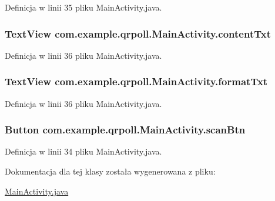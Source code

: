 Definicja w linii 35 pliku Main\+Activity.\+java.

\hypertarget{classcom_1_1example_1_1qrpoll_1_1_main_activity_aee6c7adea75224ec647353db3ca58124}{
\subsubsection[{content\+Txt}]{\setlength{\rightskip}{0pt plus 5cm}Text\+View com.\+example.\+qrpoll.\+Main\+Activity.\+content\+Txt\hspace{0.3cm}{\ttfamily [package]}}}\label{classcom_1_1example_1_1qrpoll_1_1_main_activity_aee6c7adea75224ec647353db3ca58124}


Definicja w linii 36 pliku Main\+Activity.\+java.

\hypertarget{classcom_1_1example_1_1qrpoll_1_1_main_activity_ac2f96df8bbad653bdd8630d749a23ddc}{
\subsubsection[{format\+Txt}]{\setlength{\rightskip}{0pt plus 5cm}Text\+View com.\+example.\+qrpoll.\+Main\+Activity.\+format\+Txt\hspace{0.3cm}{\ttfamily [private]}}}\label{classcom_1_1example_1_1qrpoll_1_1_main_activity_ac2f96df8bbad653bdd8630d749a23ddc}


Definicja w linii 36 pliku Main\+Activity.\+java.

\hypertarget{classcom_1_1example_1_1qrpoll_1_1_main_activity_a24aa61710d9b421c0d23ab545b4f8b99}{
\subsubsection[{scan\+Btn}]{\setlength{\rightskip}{0pt plus 5cm}Button com.\+example.\+qrpoll.\+Main\+Activity.\+scan\+Btn\hspace{0.3cm}{\ttfamily [private]}}}\label{classcom_1_1example_1_1qrpoll_1_1_main_activity_a24aa61710d9b421c0d23ab545b4f8b99}


Definicja w linii 34 pliku Main\+Activity.\+java.



Dokumentacja dla tej klasy została wygenerowana z pliku\+:\begin{DoxyCompactItemize}
\item 
\hyperlink{_main_activity_8java}{Main\+Activity.\+java}\end{DoxyCompactItemize}
